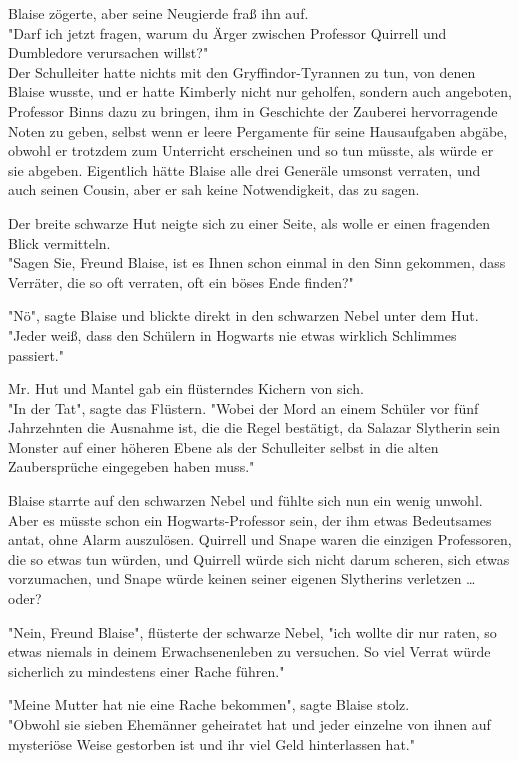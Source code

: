 {Blaise zögerte, aber seine Neugierde fraß ihn auf.\\ "Darf ich jetzt fragen, warum du Ärger zwischen Professor Quirrell und Dumbledore verursachen willst?"\\ Der Schulleiter hatte nichts mit den Gryffindor-Tyrannen zu tun, von denen Blaise wusste, und er hatte Kimberly nicht nur geholfen, sondern auch angeboten, Professor Binns dazu zu bringen, ihm in Geschichte der Zauberei hervorragende Noten zu geben, selbst wenn er leere Pergamente für seine Hausaufgaben abgäbe, obwohl er trotzdem zum Unterricht erscheinen und so tun müsste, als würde er sie abgeben. Eigentlich hätte Blaise alle drei Generäle umsonst verraten, und auch seinen Cousin, aber er sah keine Notwendigkeit, das zu sagen.

Der breite schwarze Hut neigte sich zu einer Seite, als wolle er einen fragenden Blick vermitteln.\\ "Sagen Sie, Freund Blaise, ist es Ihnen schon einmal in den Sinn gekommen, dass Verräter, die so oft verraten, oft ein böses Ende finden?"

"Nö", sagte Blaise und blickte direkt in den schwarzen Nebel unter dem Hut.\\ "Jeder weiß, dass den Schülern in Hogwarts nie etwas wirklich Schlimmes passiert."

Mr. Hut und Mantel gab ein flüsterndes Kichern von sich.\\ "In der Tat", sagte das Flüstern. "Wobei der Mord an einem Schüler vor fünf Jahrzehnten die Ausnahme ist, die die Regel bestätigt, da Salazar Slytherin sein Monster auf einer höheren Ebene als der Schulleiter selbst in die alten Zaubersprüche eingegeben haben muss."

Blaise starrte auf den schwarzen Nebel und fühlte sich nun ein wenig unwohl.\\ Aber es müsste schon ein Hogwarts-Professor sein, der ihm etwas Bedeutsames antat, ohne Alarm auszulösen. Quirrell und Snape waren die einzigen Professoren, die so etwas tun würden, und Quirrell würde sich nicht darum scheren, sich etwas vorzumachen, und Snape würde keinen seiner eigenen Slytherins verletzen … oder?

"Nein, Freund Blaise", flüsterte der schwarze Nebel, "ich wollte dir nur raten, so etwas niemals in deinem Erwachsenenleben zu versuchen. So viel Verrat würde sicherlich zu mindestens einer Rache führen."

"Meine Mutter hat nie eine Rache bekommen", sagte Blaise stolz.\\ "Obwohl sie sieben Ehemänner geheiratet hat und jeder einzelne von ihnen auf mysteriöse Weise gestorben ist und ihr viel Geld hinterlassen hat."

}
